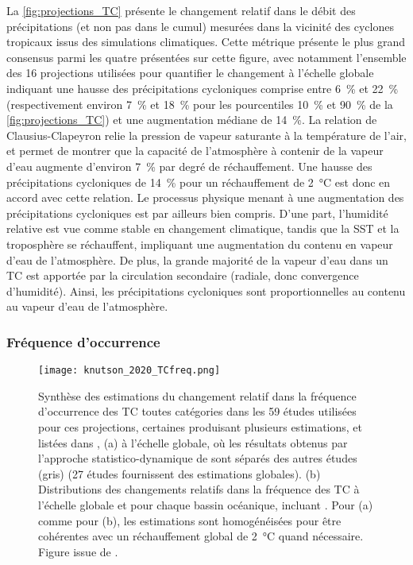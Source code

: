 \documentclass[../main.tex]{subfiles}
\begin{document}
La \cref{fig:projections_TC} présente le changement relatif dans le débit des précipitations (et non pas dans le cumul) mesurées dans la vicinité des cyclones
tropicaux issus des simulations climatiques. Cette métrique présente le plus grand consensus parmi les quatre présentées sur cette figure, avec notamment
l'ensemble des \num{16} projections utilisées pour quantifier le changement à l'échelle globale indiquant une hausse des précipitations cycloniques comprise
entre \SI{6}{\percent} et \SI{22}{\percent} (respectivement environ \SI{7}{\percent} et \SI{18}{\percent} pour les pourcentiles \SI{10}{\percent} et
\SI{90}{\percent} de la \cref{fig:projections_TC}) et une augmentation médiane de \SI{14}{\percent}. La relation de Clausius-Clapeyron relie la pression de
vapeur saturante à la température de l'air, et permet de montrer que la capacité de l'atmosphère à contenir de la vapeur d'eau augmente d'environ
\SI{7}{\percent} par degré de réchauffement. Une hausse des précipitations cycloniques de \SI{14}{\percent} pour un réchauffement de \SI{2}{\degreeCelsius} est
donc en accord avec cette relation. Le processus physique menant à une augmentation des précipitations cycloniques est par ailleurs bien compris. D'une part,
l'humidité relative est vue comme stable en changement climatique, tandis que la SST et la troposphère se réchauffent, impliquant une augmentation du contenu en
vapeur d'eau de l'atmosphère. De plus, la grande majorité de la vapeur d'eau dans un TC est apportée par la circulation secondaire (radiale, donc convergence
d'humidité). Ainsi, les précipitations cycloniques sont proportionnelles au contenu au vapeur d'eau de l'atmosphère.

\subsubsection*{Fréquence d'occurrence}

\begin{figure}[htb]
    \centering
    \texttt{[image: knutson\_2020\_TCfreq.png]}
    \caption{Synthèse des estimations du changement relatif dans la fréquence d'occurrence des TC toutes catégories dans les \num{59} études utilisées pour ces
        projections, certaines produisant plusieurs estimations, et listées dans \cite[][documents supplémentaires, tableau ES1]{knutson_tropical_2020}, (a) à
        l'échelle globale, où les résultats obtenus par l'approche statistico-dynamique de \cite{emanuel_downscaling_2013} sont séparés des autres études (gris)
        (27 études fournissent des estimations globales). (b) Distributions des changements relatifs dans la fréquence des TC à l'échelle globale et pour chaque
        bassin océanique, incluant \cite{emanuel_downscaling_2013}. Pour (a) comme pour (b), les estimations sont homogénéisées pour être cohérentes avec un
        réchauffement global de \SI{2}{\degreeCelsius} quand nécessaire. Figure issue de \cite{knutson_tropical_2020}.}
    \label{fig:TC_freq_summary}
\end{figure}
\end{document}
